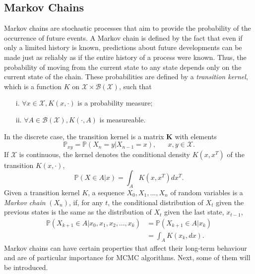 \documentclass[12pt]{book}
\begin{document}
\subsection{Markov Chains}
Markov chains are stochastic processes that aim to provide the probability of the occurrence of future events. A Markov chain is defined by the fact that even if only a limited history is known, predictions about future developments can be made just as reliably as if the entire history of a process were known. Thus, the probability of moving from the current state to any state depends only on the current state of the chain. These probabilities are defined by a \textit{transition kernel}, which is a function $K$ on $\mathcal{X} \times \mathcal{B}\left(\mathcal{X}\right)$, such that
\begin{itemize}
    \item[i.] $\forall x\in\mathcal{X}, K\left(x, \cdot\right)$ is a probability measure;
    \item[ii.] $\forall A\in \mathcal{B}\left(\mathcal{X}\right), K\left(\cdot, A\right)$ is measureable.
\end{itemize}
In the discrete case, the transition kernel is a matrix $\pmb{K}$ with elements
\begin{equation*}
    \mathbb{P}_{xy}=\mathbb{P}\left(X_n=y|X_{n-1}=x\right), \hspace{20pt}x,y\in\mathcal{X}.
\end{equation*}
If $\mathcal{X}$ is continuous, the kernel denotes the conditional density $K\left(x,x^T\right)$ of the transition $K\left(x,\cdot\right)$,
\begin{equation*}
    \mathbb{P}\left(X\in A|x\right)=\int_AK\left(x,x^T\right)dx^T.
\end{equation*}
Given a transition kernel $K$, a sequence $X_0,X_1,...,X_n$ of random variables is a \textit{Markov chain} $\left(X_n\right)$, if, for any $t$, the conditional distribution of $X_t$ given the previous states is the same as the distribution of $X_t$ given the last state, $x_{t-1}$,
\begin{align}
    \mathbb{P}\left(X_{k+1}\in A|x_0,x_1,x_2,...,x_k\right) &= \mathbb{P}\left(X_{k+1}\in A|x_k\right) \nonumber\\
    &= \int_A K\left(x_k, dx\right). 
\end{align}
Markov chains can have certain properties that affect their long-term behaviour and are of particular importance for MCMC algorithms. Next, some of them will be introduced.
\end{document}

